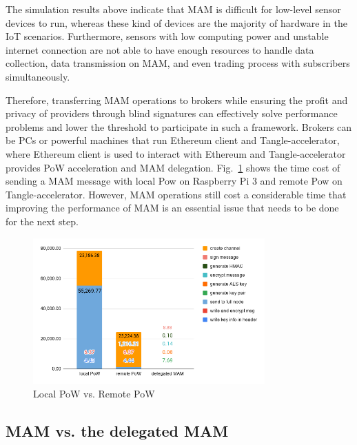 \documentclass[conference]{IEEEtran}
\begin{document}
The simulation results above indicate that MAM is difficult for low-level sensor devices to run, whereas these kind of devices are the majority of hardware in the IoT scenarios. Furthermore, sensors with low computing power and unstable internet connection are not able to have enough resources to handle data collection, data transmission on MAM, and even trading process with subscribers simultaneously.

Therefore, transferring MAM operations to brokers while ensuring the profit and privacy of providers through blind signatures can effectively solve performance problems and lower the threshold to participate in such a framework. Brokers can be PCs or powerful machines that run Ethereum client and Tangle-accelerator, where Ethereum client is used to interact with Ethereum and Tangle-accelerator provides PoW acceleration and MAM delegation. Fig.~\ref{fig:rpi3_pow} shows the time cost of sending a MAM message with local Pow on Raspberry Pi 3 and remote Pow on Tangle-accelerator. However, MAM operations still cost a considerable time that improving the performance of MAM is an essential issue that needs to be done for the next step.

\begin{figure}[!t]
    \centering
    \includegraphics[width=3.5in]{rpi3_pow}
    \caption{Local PoW vs. Remote PoW}
    \label{fig:rpi3_pow}
\end{figure}

\subsection{MAM vs. the delegated MAM}
\label{section:smart_contract_evaluation}
\end{document}
